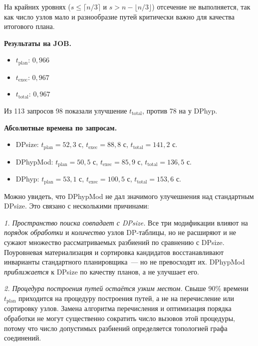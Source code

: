 На крайних уровнях ($s \leqslant \lceil n/3 \rceil$ и $s > n - \lfloor n/3 \rfloor$)
отсечение не выполняется, так как число узлов мало и разнообразие путей критически важно для качества 
итогового плана.



\textbf{Результаты на JOB.}
\begin{itemize}
    \item $t_{\mathrm{plan}}$: $0{,}966$
    \item $t_{\mathrm{exec}}$: $0{,}967$
    \item $t_{\mathrm{total}}$: $0{,}967$
\end{itemize}

Из 113 запросов 98 показали улучшение $t_{\mathrm{total}}$,
против 78 на у DPhyp.
\par

\textbf{Абсолютные времена по  запросам.}
\begin{itemize}
    \item DPsize: $t_{\mathrm{plan}} = 52{,}3$ с,\;
    $t_{\mathrm{exec}} = 88{,}8$ с,\; $t_{\mathrm{total}} = 141{,}2$ с.
    \item DPhypMod: $t_{\mathrm{plan}} = 50{,}5$ с,\;
    $t_{\mathrm{exec}} = 85{,}9$ с,\; $t_{\mathrm{total}} = 136{,}5$ с.
    \item DPhyp: $t_{\mathrm{plan}} = 53{,}1$ с,\;
    $t_{\mathrm{exec}} = 100{,}5$ с,\; $t_{\mathrm{total}} = 153{,}6$ с.
\end{itemize}

Можно увидеть, что DPhypMod не дал значимого улучешнения над стандартным DPsize.
Это связано с несколькими причинами:
\par

\textit{1. Пространство поиска совпадает с DPsize.}
Все три модификации влияют на \emph{порядок обработки} и \emph{количество}
узлов DP-таблицы, но не расширяют и не сужают множество рассматриваемых
разбиений по сравнению с DPsize.
Поуровневая материализация и сортировка кандидатов восстанавливают
инварианты стандартного планировщика~--- но не превосходят их.
DPhypMod \emph{приближается} к DPsize по качеству планов,
а не улучшает его.
\par

\textit{2. Процедура построения путей остаётся узким местом.}
Свыше 90\% времени $t_{\mathrm{plan}}$ приходится на процедуру построения путей,
а не на перечисление или сортировку узлов.
Замена алгоритма перечисления и оптимизация порядка
обработки не могут существенно сократить число вызовов этой процедуры,
потому что число допустимых разбиений определяется топологией графа
соединений.
\par

